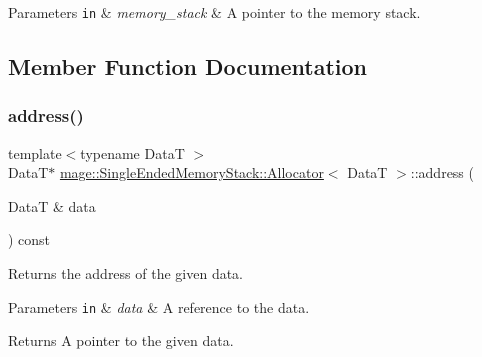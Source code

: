 \begin{DoxyParams}[1]{Parameters}
\mbox{\tt in}  & {\em memory\+\_\+stack} & A pointer to the memory stack. \\
\hline
\end{DoxyParams}


\subsection{Member Function Documentation}
\hypertarget{structmage_1_1_single_ended_memory_stack_1_1_allocator_a5bb7b9d5ba3907afb70306f7606ab6cd}{}\label{structmage_1_1_single_ended_memory_stack_1_1_allocator_a5bb7b9d5ba3907afb70306f7606ab6cd} 
\subsubsection{\texorpdfstring{address()}{address()}\hspace{0.1cm}{\footnotesize\ttfamily [1/2]}}
{\footnotesize\ttfamily template$<$typename DataT $>$ \\
DataT$\ast$ \hyperlink{structmage_1_1_single_ended_memory_stack_1_1_allocator}{mage\+::\+Single\+Ended\+Memory\+Stack\+::\+Allocator}$<$ DataT $>$\+::address (\begin{DoxyParamCaption}\item[{DataT \&}]{data }\end{DoxyParamCaption}) const\hspace{0.3cm}{\ttfamily [noexcept]}}

Returns the address of the given data.


\begin{DoxyParams}[1]{Parameters}
\mbox{\tt in}  & {\em data} & A reference to the data. \\
\hline
\end{DoxyParams}
\begin{DoxyReturn}{Returns}
A pointer to the given data. 
\end{DoxyReturn}
\hypertarget{structmage_1_1_single_ended_memory_stack_1_1_allocator_abe5c2b2a569ff0c61f7c4c7ee4625b05}{}\label{structmage_1_1_single_ended_memory_stack_1_1_allocator_abe5c2b2a569ff0c61f7c4c7ee4625b05} 
